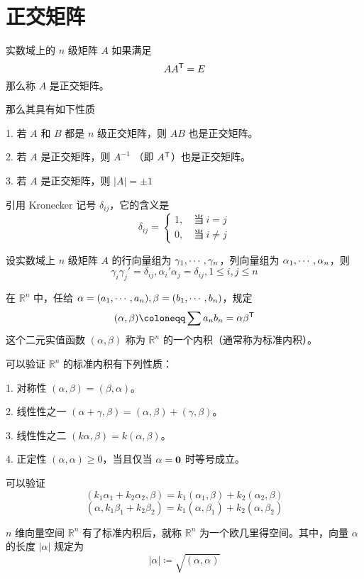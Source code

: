 \section{正交矩阵}

\begin{definition}
	实数域上的 $n$ 级矩阵 $A$ 如果满足
	\[A{A}^\mathsf{T}=E\]
	那么称 $A$ 是正交矩阵。
\end{definition}

那么其具有如下性质

1. 若 $A$ 和  $B$ 都是 $n$ 级正交矩阵，则 $AB$ 也是正交矩阵。

2. 若 $A$ 是正交矩阵，则 $A^{-1}$ （即 ${A}^\mathsf{T}$）也是正交矩阵。

3. 若 $A$ 是正交矩阵，则 $|A|=\pm 1$


引用 Kronecker 记号 $\delta_{ij}$，它的含义是
\[\delta_{ij}=\begin{cases}
		1,\quad \text{当}\ i = j \\
		0,\quad \text{当}\ i \ne j
	\end{cases}\]

\begin{theorem}
	设实数域上 $n$ 级矩阵 $A$ 的行向量组为 $\gamma_1,\cdots,\gamma_n$，列向量组为 $\alpha_1,\cdots,\alpha_n$，则
	\[\gamma_i\gamma_j'=\delta_{ij},\alpha_i'\alpha_j=\delta_{ij},1 \leqslant i,j \leqslant n\]
\end{theorem}

\begin{definition}
	在 $\mathbb{R}^n$ 中，任给 $\alpha = (a_1,\cdots,a_n),\beta=(b_1,\cdots,b_n)$，规定
	\[(\alpha,\beta) \coloneqq  \sum a_nb_n = \alpha\transpose{\beta}\]
	这个二元实值函数 $(\alpha,\beta)$ 称为 $\mathbb{R}^n$ 的一个内积（通常称为标准内积）。
\end{definition}

可以验证 $\mathbb{R}^n$ 的标准内积有下列性质：

1. 对称性 $(\alpha,\beta) = (\beta,\alpha)$。

2. 线性性之一 $(\alpha+\gamma,\beta) = (\alpha,\beta) + (\gamma,\beta)$。

3. 线性性之二 $(k\alpha,\beta) = k(\alpha,\beta)$。

4. 正定性 $(\alpha,\alpha) \geqslant 0$，当且仅当 $\alpha=\boldsymbol{0}$ 时等号成立。

可以验证
\[(k_1\alpha_1+k_2\alpha_2, \beta) = k_1(\alpha_1,\beta) + k_2(\alpha_2,\beta)\]
\[(\alpha, k_1\beta_1+k_2\beta_2) = k_1(\alpha,\beta_1) + k_2(\alpha,\beta_2)\]

$n$ 维向量空间 $\mathbb{R}^n$ 有了标准内积后，就称 $\mathbb{R}^n$ 为一个欧几里得空间。其中，向量 $\alpha$ 的长度 $|\alpha|$ 规定为
\[|\alpha| \coloneqq  \sqrt{(\alpha,\alpha)}\]

